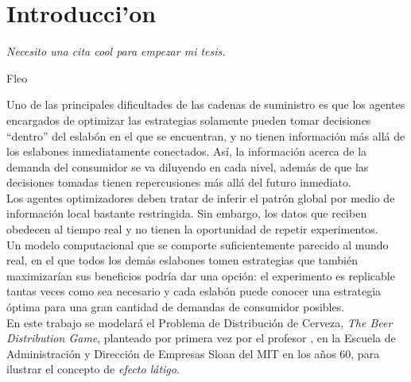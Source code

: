 \chapter{Introducci'on}

\textit{Necesito una cita cool para empezar mi tesis.}
\begin{flushright}
 Fleo
 \end{flushright}

\vspace{10 pt}





Uno de las principales dificultades de las cadenas de suministro es que los agentes encargados de optimizar las estrategias solamente pueden tomar decisiones ``dentro'' del eslabón en el que se encuentran, y no tienen información más allá de los eslabones inmediatamente conectados. Así, la información acerca de la demanda del consumidor se va diluyendo en cada nivel, además de que las decisiones tomadas tienen repercusiones más allá del futuro inmediato. \\

Los agentes optimizadores deben tratar de inferir el patrón global por medio de información local bastante restringida. Sin embargo, los datos que reciben obedecen al tiempo real y no tienen la oportunidad de repetir experimentos.\\




Un modelo computacional que se comporte suficientemente parecido al mundo real, en el que todos los demás eslabones tomen estrategias que también maximizarían sus beneficios podría dar una opción: el experimento es replicable tantas veces como sea necesario y cada eslabón puede conocer una estrategia óptima para una gran cantidad de demandas de consumidor posibles.\\

En este trabajo se modelará el Problema de Distribución de Cerveza, \textit{The Beer Distribution Game}, planteado por primera vez por el profesor \citet{Forrester}, en la Escuela de Administraci\'on y Direcci\'on de Empresas Sloan del MIT en los años 60, para ilustrar el concepto de \textit{efecto l\'atigo}. \\

